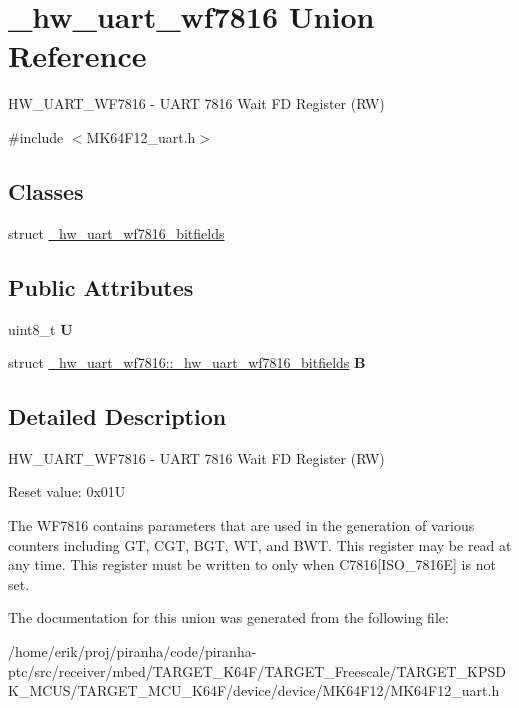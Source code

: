 \hypertarget{union__hw__uart__wf7816}{}\section{\+\_\+hw\+\_\+uart\+\_\+wf7816 Union Reference}
\label{union__hw__uart__wf7816}


H\+W\+\_\+\+U\+A\+R\+T\+\_\+\+W\+F7816 -\/ U\+A\+RT 7816 Wait FD Register (RW)  




{\ttfamily \#include $<$M\+K64\+F12\+\_\+uart.\+h$>$}

\subsection*{Classes}
\begin{DoxyCompactItemize}
\item 
struct \hyperlink{struct__hw__uart__wf7816_1_1__hw__uart__wf7816__bitfields}{\+\_\+hw\+\_\+uart\+\_\+wf7816\+\_\+bitfields}
\end{DoxyCompactItemize}
\subsection*{Public Attributes}
\begin{DoxyCompactItemize}
\item 
uint8\+\_\+t {\bfseries U}\hypertarget{union__hw__uart__wf7816_aaa480d96cd8cf7690004f41f41ec64c7}{}\label{union__hw__uart__wf7816_aaa480d96cd8cf7690004f41f41ec64c7}

\item 
struct \hyperlink{struct__hw__uart__wf7816_1_1__hw__uart__wf7816__bitfields}{\+\_\+hw\+\_\+uart\+\_\+wf7816\+::\+\_\+hw\+\_\+uart\+\_\+wf7816\+\_\+bitfields} {\bfseries B}\hypertarget{union__hw__uart__wf7816_a4c72d8f0681bf845598e2290b5654a48}{}\label{union__hw__uart__wf7816_a4c72d8f0681bf845598e2290b5654a48}

\end{DoxyCompactItemize}


\subsection{Detailed Description}
H\+W\+\_\+\+U\+A\+R\+T\+\_\+\+W\+F7816 -\/ U\+A\+RT 7816 Wait FD Register (RW) 

Reset value\+: 0x01U

The W\+F7816 contains parameters that are used in the generation of various counters including GT, C\+GT, B\+GT, WT, and B\+WT. This register may be read at any time. This register must be written to only when C7816\mbox{[}I\+S\+O\+\_\+7816E\mbox{]} is not set. 

The documentation for this union was generated from the following file\+:\begin{DoxyCompactItemize}
\item 
/home/erik/proj/piranha/code/piranha-\/ptc/src/receiver/mbed/\+T\+A\+R\+G\+E\+T\+\_\+\+K64\+F/\+T\+A\+R\+G\+E\+T\+\_\+\+Freescale/\+T\+A\+R\+G\+E\+T\+\_\+\+K\+P\+S\+D\+K\+\_\+\+M\+C\+U\+S/\+T\+A\+R\+G\+E\+T\+\_\+\+M\+C\+U\+\_\+\+K64\+F/device/device/\+M\+K64\+F12/M\+K64\+F12\+\_\+uart.\+h\end{DoxyCompactItemize}
